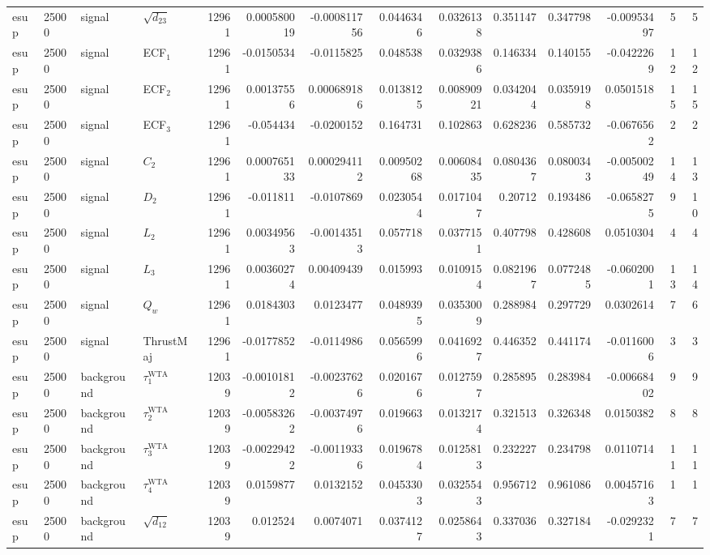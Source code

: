 \begin{landscape}
\begin{longtable}{llll r rrrr rr r rr}
esup & 25000 & signal & $\sqrt{d_{23}}$ & 12961 & 0.000580019 & -0.000811756 & 0.0446346 & 0.0326138 & 0.351147 & 0.347798 & -0.00953497 & 5 & 5 \\
esup & 25000 & signal & ECF$_1$ & 12961 & -0.0150534 & -0.0115825 & 0.048538 & 0.0329386 & 0.146334 & 0.140155 & -0.0422269 & 12 & 12 \\
esup & 25000 & signal & ECF$_2$ & 12961 & 0.00137556 & 0.000689186 & 0.0138125 & 0.00890921 & 0.0342044 & 0.0359198 & 0.0501518 & 15 & 15 \\
esup & 25000 & signal & ECF$_3$ & 12961 & -0.054434 & -0.0200152 & 0.164731 & 0.102863 & 0.628236 & 0.585732 & -0.0676562 & 2 & 2 \\
esup & 25000 & signal & $C_2$ & 12961 & 0.000765133 & 0.000294112 & 0.00950268 & 0.00608435 & 0.0804367 & 0.0800343 & -0.00500249 & 14 & 13 \\
esup & 25000 & signal & $D_2$ & 12961 & -0.011811 & -0.0107869 & 0.0230544 & 0.0171047 & 0.20712 & 0.193486 & -0.0658275 & 9 & 10 \\
esup & 25000 & signal & $L_2$ & 12961 & 0.00349563 & -0.00143513 & 0.057718 & 0.0377151 & 0.407798 & 0.428608 & 0.0510304 & 4 & 4 \\
esup & 25000 & signal & $L_3$ & 12961 & 0.00360274 & 0.00409439 & 0.015993 & 0.0109154 & 0.0821967 & 0.0772485 & -0.0602001 & 13 & 14 \\
esup & 25000 & signal & $Q_w$ & 12961 & 0.0184303 & 0.0123477 & 0.0489395 & 0.0353009 & 0.288984 & 0.297729 & 0.0302614 & 7 & 6 \\
esup & 25000 & signal & ThrustMaj & 12961 & -0.0177852 & -0.0114986 & 0.0565996 & 0.0416927 & 0.446352 & 0.441174 & -0.0116006 & 3 & 3 \\
esup & 25000 & background & $\tau_1^{\mathrm{WTA}}$ & 12039 & -0.00101812 & -0.00237626 & 0.0201676 & 0.0127597 & 0.285895 & 0.283984 & -0.00668402 & 9 & 9 \\
esup & 25000 & background & $\tau_2^{\mathrm{WTA}}$ & 12039 & -0.00583262 & -0.00374976 & 0.019663 & 0.0132174 & 0.321513 & 0.326348 & 0.0150382 & 8 & 8 \\
esup & 25000 & background & $\tau_3^{\mathrm{WTA}}$ & 12039 & -0.00229422 & -0.00119336 & 0.0196784 & 0.0125813 & 0.232227 & 0.234798 & 0.0110714 & 11 & 11 \\
esup & 25000 & background & $\tau_4^{\mathrm{WTA}}$ & 12039 & 0.0159877 & 0.0132152 & 0.0453303 & 0.0325543 & 0.956712 & 0.961086 & 0.00457163 & 1 & 1 \\
esup & 25000 & background & $\sqrt{d_{12}}$ & 12039 & 0.012524 & 0.0074071 & 0.0374127 & 0.0258643 & 0.337036 & 0.327184 & -0.0292321 & 7 & 7 \\

\end{longtable}
\end{landscape}
